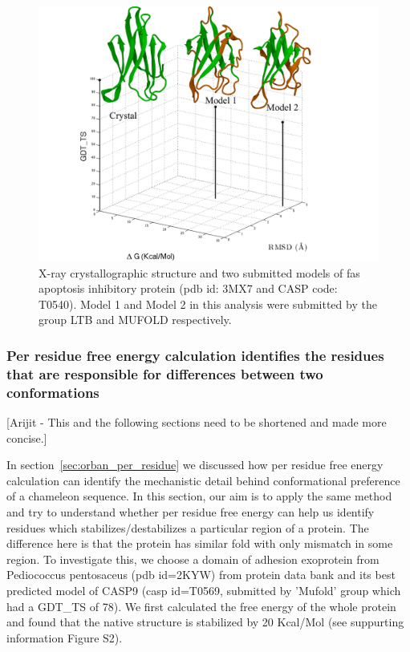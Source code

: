 \documentclass[12pt]{article}
\newcommand{\Ken}[1]{\color{red}#1\normalcolor}
\begin{document}
\begin{figure}
\begin{center}
\includegraphics[width=4.0 in,height=3.4 in]{T0540.pdf}
\end{center}
\caption{X-ray crystallographic structure and two submitted models of fas apoptosis inhibitory protein (pdb id: 3MX7 and CASP code: T0540).
Model 1 and Model 2 in this analysis were submitted by the group LTB and MUFOLD respectively.}
\label{fig:T0540}
\end{figure}

\subsubsection{Per residue free energy calculation identifies the residues that are responsible for
differences between two conformations}

\Ken{[Arijit - This and the following sections need to be shortened and made more concise.]}

In section~\protect\ref{sec:orban_per_residue} we discussed how per residue free energy calculation
can identify the mechanistic detail behind conformational preference of a chameleon sequence. In this section, our aim 
is to apply the same method and try to understand whether per residue free energy can help us identify
residues which stabilizes/destabilizes a particular region of a protein. The difference  
here is that the protein has similar fold with only mismatch in some region. 
To investigate this, we choose a domain of adhesion exoprotein from Pediococcus pentosaceus (pdb id=2KYW) from protein data bank 
and its best predicted model of CASP9 (casp id=T0569, submitted by 'Mufold' group which had a GDT\_TS of 78).
We first calculated the free energy of the whole protein and found that the native 
structure is stabilized by 20 Kcal/Mol (see suppurting information Figure S2). 
\end{document}
